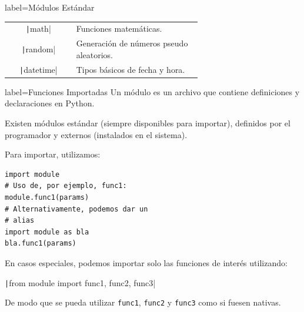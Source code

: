 \begin{contentbox}{label=Módulos Estándar}
    \small
    \begin{tabular}{C|p{0.65\linewidth}}
        \texttt|math| & Funciones matemáticas. \\
        \texttt|random| & Generación de números pseudo aleatorios. \\
        \texttt|datetime| & Tipos básicos de fecha y hora. \\
    \end{tabular}
\end{contentbox}

\begin{contentbox}{label=Funciones Importadas}
    Un módulo es un archivo que contiene definiciones y declaraciones en Python.
    
    Existen módulos estándar (siempre disponibles para importar), definidos por el programador y externos (instalados en el sistema).
    
    Para importar, utilizamos:
    \begin{verbatim}
import module
# Uso de, por ejemplo, func1:
module.func1(params)
# Alternativamente, podemos dar un 
# alias
import module as bla
bla.func1(params)
    \end{verbatim}
    
    En casos especiales, podemos importar solo las funciones de interés utilizando:
    \begin{center}
        \texttt|from module import func1, func2, func3|
    \end{center}
    De modo que se pueda utilizar \verb|func1|, \verb|func2| y \verb|func3| como si fuesen nativas.
\end{contentbox}

